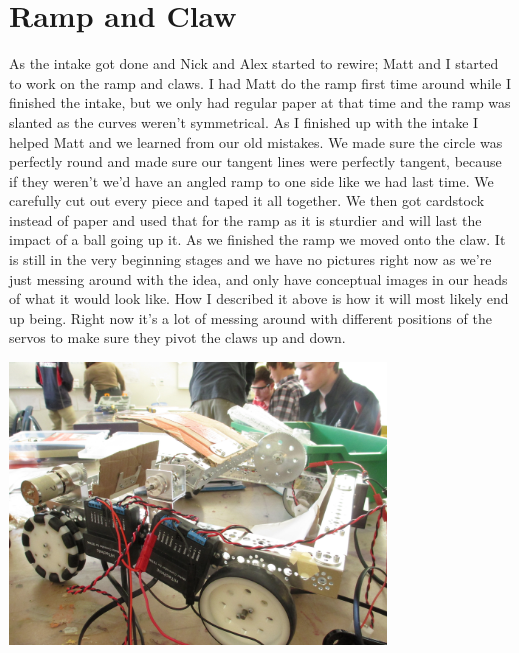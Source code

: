 \section*{Ramp and Claw}
As the intake got done and Nick and Alex started to rewire; Matt and I started to work on the ramp and claws. I had Matt do the ramp first time around while I finished the intake, but we only had regular paper at that time and the ramp was slanted as the curves weren't symmetrical. As I finished up with the intake I helped Matt and we learned from our old mistakes. We made sure the circle was perfectly round and made sure our tangent lines were perfectly tangent, because if they weren't we'd have an angled ramp to one side like we had last time. We carefully cut out every piece and taped it all together. We then got cardstock instead of paper and used that for the ramp as it is sturdier and will last the impact of a ball going up it. As we finished the ramp we moved onto the claw. It is still in the very beginning stages and we have no pictures right now as we're just messing around with the idea, and only have conceptual images in our heads of what it would look like. How I described it above is how it will most likely end up being. Right now it's a lot of messing around with different positions of the servos to make sure they pivot the claws up and down. 

\begin{center}
\includegraphics[width=10cm]{./Entries/Images/RobotDesignForNovemberTwentyFirstTwoThousandAndFourteenWithIntakeLauncherAndRampWiringIncludedILoveAlexHeIsTheBestNic.JPG}
\end{center}
